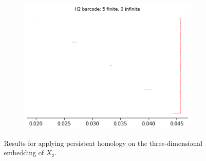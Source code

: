 \begin{figure}[H]
\begin{subfigure}[b]{0.24\textwidth}
\includegraphics[width=\textwidth]{figures/topology/X2_H2_barcode.png}
 \caption{}
\end{subfigure}
\caption{Results for applying persistent homology on the three-dimensional embedding of $X_2$.}
\end{figure}

